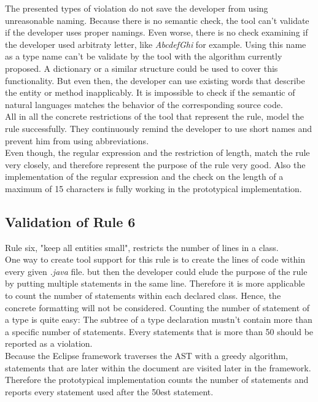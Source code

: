 The presented types of violation do not save the developer from using unreasonable naming. Because there is no semantic check, the tool can't validate if the developer uses proper namings. Even worse, there is no check examining if the developer used arbitraty letter, like \textit{AbcdefGhi} for example. Using this name as a type name can't be validate by the tool with the algorithm currently proposed. A dictionary or a similar structure could be used to cover this functionality. But even then, the developer can use existing words that describe the entity or method inapplicably. It is impossible to check if the semantic of natural languages matches the behavior of the corresponding source code.
\\

All in all the concrete restrictions of the tool that represent the rule, model the rule successfully. They continuously remind the developer to use short names and prevent him from using abbreviations. 
\\

Even though, the regular expression and the restriction of length, match the rule very closely, and therefore represent the purpose of the rule very good. Also the implementation of the regular expression and the check on the length of a maximum of 15 characters is fully working in the prototypical implementation.


\subsection*{Validation of Rule 6}
Rule six, "keep all entities small", restricts the number of lines in a class.
\\

One way to create tool support for this rule is to create the lines of code within every given \textit{.java} file. but then the developer could elude the purpose of the rule by putting multiple statements in the same line. Therefore it is more applicable to count the number of statements within each declared class. Hence, the concrete formatting will not be considered. Counting the number of statement of a type is quite easy: The subtree of a type declaration mustn't contain more than a specific number of statements. Every statements that is more than 50 should be reported as a violation. 
\\

Because the Eclipse framework traverses the \acf{AST} with a greedy algorithm, statements that are later within the document are visited later in the framework. Therefore the prototypical implementation counts the number of statements and reports every statement used after the 50est statement.
\\

